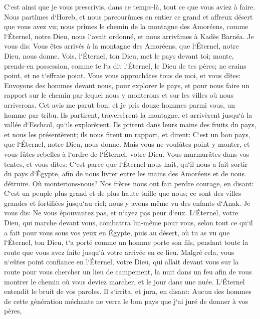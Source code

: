 \verse C`est ainsi que je vous prescrivis, dans ce temps-là, tout ce que vous aviez à faire. 
\verse Nous partîmes d`Horeb, et nous parcourûmes en entier ce grand et affreux désert que vous avez vu; nous prîmes le chemin de la montagne des Amoréens, comme l`Éternel, notre Dieu, nous l`avait ordonné, et nous arrivâmes à Kadès Barnéa. 
\verse Je vous dis: Vous êtes arrivés à la montagne des Amoréens, que l`Éternel, notre Dieu, nous donne. 
\verse Vois, l`Éternel, ton Dieu, met le pays devant toi; monte, prends-en possession, comme te l`a dit l`Éternel, le Dieu de tes pères; ne crains point, et ne t`effraie point. 
\verse Vous vous approchâtes tous de moi, et vous dîtes: Envoyons des hommes devant nous, pour explorer le pays, et pour nous faire un rapport sur le chemin par lequel nous y monterons et sur les villes où nous arriverons. 
\verse Cet avis me parut bon; et je pris douze hommes parmi vous, un homme par tribu. 
\verse Ils partirent, traversèrent la montagne, et arrivèrent jusqu`à la vallée d`Eschcol, qu`ils explorèrent. 
\verse Ils prirent dans leurs mains des fruits du pays, et nous les présentèrent; ils nous firent un rapport, et dirent: C`est un bon pays, que l`Éternel, notre Dieu, nous donne. 
\verse Mais vous ne voulûtes point y monter, et vous fûtes rebelles à l`ordre de l`Éternel, votre Dieu. 
\verse Vous murmurâtes dans vos tentes, et vous dîtes: C`est parce que l`Éternel nous hait, qu`il nous a fait sortir du pays d`Égypte, afin de nous livrer entre les mains des Amoréens et de nous détruire. 
\verse Où monterions-nous? Nos frères nous ont fait perdre courage, en disant: C`est un peuple plus grand et de plus haute taille que nous; ce sont des villes grandes et fortifiées jusqu`au ciel; nous y avons même vu des enfants d`Anak. 
\verse Je vous dis: Ne vous épouvantez pas, et n`ayez pas peur d`eux. 
\verse L`Éternel, votre Dieu, qui marche devant vous, combattra lui-même pour vous, selon tout ce qu`il a fait pour vous sous vos yeux en Égypte, 
\verse puis au désert, où tu as vu que l`Éternel, ton Dieu, t`a porté comme un homme porte son fils, pendant toute la route que vous avez faite jusqu`à votre arrivée en ce lieu. 
\verse Malgré cela, vous n`eûtes point confiance en l`Éternel, votre Dieu, 
\verse qui allait devant vous sur la route pour vous chercher un lieu de campement, la nuit dans un feu afin de vous montrer le chemin où vous deviez marcher, et le jour dans une nuée. 
\verse L`Éternel entendit le bruit de vos paroles. Il s`irrita, et jura, en disant: 
\verse Aucun des hommes de cette génération méchante ne verra le bon pays que j`ai juré de donner à vos pères, 
